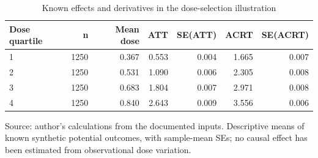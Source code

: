 \begin{table}[htbp]
\centering
\footnotesize
\caption{Known effects and derivatives in the dose-selection illustration}
\begin{tabularx}{\linewidth}{Xrrrrrr}
\toprule
Dose quartile & n & Mean dose & ATT & SE(ATT) & ACRT & SE(ACRT) \\
\midrule
1 & 1250 & 0.367 & 0.553 & 0.004 & 1.665 & 0.007 \\
2 & 1250 & 0.531 & 1.090 & 0.006 & 2.305 & 0.008 \\
3 & 1250 & 0.683 & 1.804 & 0.007 & 2.971 & 0.008 \\
4 & 1250 & 0.840 & 2.643 & 0.009 & 3.556 & 0.006 \\
\bottomrule
\end{tabularx}
\par\vspace{3pt}\begin{minipage}{\linewidth}\footnotesize Source: author's calculations from the documented inputs.\allowbreak{} Descriptive means of known synthetic potential outcomes, with sample-mean SEs; no causal effect has been estimated from observational dose variation.\allowbreak{}\end{minipage}
\end{table}
